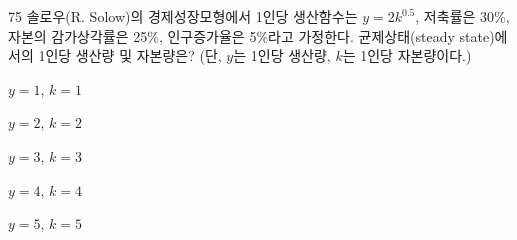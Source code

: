 \begin{question}{75}
솔로우(R. Solow)의 경제성장모형에서 1인당 생산함수는 $y=2k^{0.5}$, 저축률은 30\%, 자본의 감가상각률은 25\%, 인구증가율은 5\%라고 가정한다. 균제상태(steady state)에서의 1인당 생산량 및 자본량은? (단, $y$는 1인당 생산량, $k$는 1인당 자본량이다.)
\begin{choices}
  \item $y = 1$, $k = 1$
  \item $y = 2$, $k = 2$
  \item $y = 3$, $k = 3$
  \item $y = 4$, $k = 4$
  \item $y = 5$, $k = 5$
\end{choices}
\end{question}
